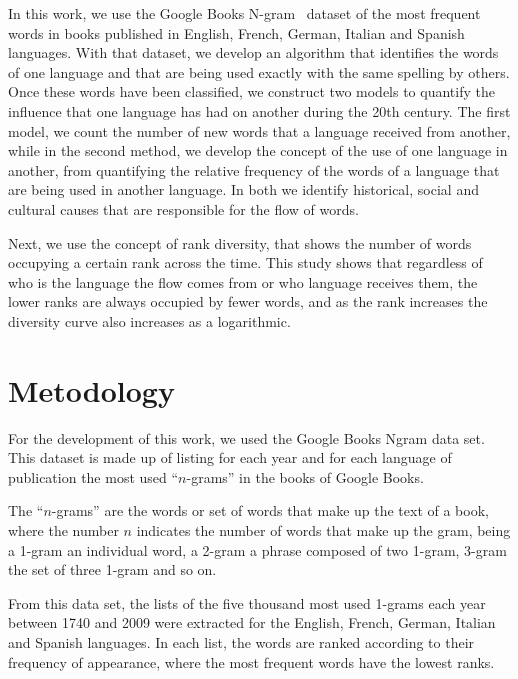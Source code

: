 \documentclass[10pt,letterpaper]{article} %
\begin{document}
	In this work, we use the Google Books N-gram~\cite{ngramv} dataset of the most
	frequent words in books published in  English, French, German, Italian and
	Spanish languages.  With that dataset,  we develop an algorithm that identifies
	the words of one language  and that are being used exactly with the same 
	spelling by others. Once these words
	have been classified, we construct two models to quantify  the influence that
	one language has had on another during the 20th century. The first model, we
	count the number of new words that a language received from another, while in
	the second method, we develop the concept of the use of one language in
	another,  from quantifying the relative frequency of  the words of a language
	that are being used in another language. In both we identify historical, social
	and cultural causes that are responsible for the flow of words.
	
	Next, we use the concept of rank diversity,  that shows the number of words
	occupying a certain rank across the time. This study shows that  regardless of
	who is the language the flow comes from or who language receives them,  the
	lower ranks are always occupied by fewer  words, and as the rank increases the
	diversity curve also increases as a logarithmic. 
	
	
	\section*{Metodology} %
	
	
	For the development of this work,  we used the Google Books Ngram data set.
	This dataset is made up of listing for each year and for each language of
	publication the most used ``$n$-grams'' in the books of Google Books. 
	
	The ``$n$-grams'' are the words or set of words that make up the text of a
	book, where the number $n$ indicates the number of words that make up the gram,
	being a 1-gram an individual word, a 2-gram a phrase composed of two 1-gram,
	3-gram the set of three 1-gram and so on.
	
	From this data set, the lists of the five thousand most used 1-grams each year
	between 1740 and 2009 were extracted for the English, French, German, Italian
	and Spanish languages. In each list, the words are ranked according to their
	frequency of appearance, where the most frequent words have the lowest ranks.
	
\end{document}
